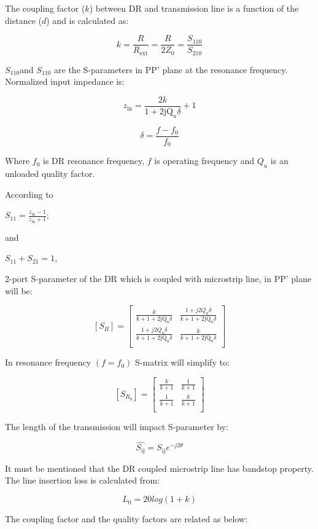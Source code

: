 The coupling factor (\(k\)) between DR and transmission line is a
function of the distance (\(d\)) and is calculated as:

\[k = \frac{R}{R_{\text{ext}}} = \frac{R}{2Z_{0}} = \frac{S_{110}}{S_{210}}\]

\(S_{110}\)and \(S_{110}\) are the S-parameters in PP' plane at the
resonance frequency. Normalized input impedance is:

\[z_{\text{in}} = \frac{2k}{1 + 2\text{jQ}_{u}\delta} + 1\]

\[\delta = \frac{f - f_{0}}{f_{0}}\]

Where \(f_{0}\) is DR resonance frequency, \(f\) is operating frequency
and \(Q_{u}\) is an unloaded quality factor.

According to

\(S_{11} = \frac{z_{\text{in}} - 1}{z_{\text{in}} + 1}\);

and

\(S_{11} + S_{21} = 1\),

2-port S-parameter of the DR which is coupled with microstrip line, in
PP' plane will be:

\[\left\lbrack S_{R} \right\rbrack = \begin{bmatrix}
\frac{k}{k + 1 + 2\text{jQ}_{u}\delta} & \frac{1 + j2Q_{u}\delta}{k + 1 + 2\text{jQ}_{u}\delta} \\
\frac{1 + j2Q_{u}\delta}{k + 1 + 2\text{jQ}_{u}\delta} & \frac{k}{k + 1 + 2\text{jQ}_{u}\delta} \\
\end{bmatrix}\]

In resonance frequency \((f = f_{0})\) S-matrix will simplify to:

\[\left\lbrack S_{R_{0}} \right\rbrack = \begin{bmatrix}
\frac{k}{k + 1} & \frac{1}{k + 1} \\
\frac{1}{k + 1} & \frac{k}{k + 1} \\
\end{bmatrix}\]

The length of the transmission will impact S-parameter by:

\[\widehat{S_{\text{ij}}} = S_{\text{ij}}e^{- j2\theta}\]

It must be mentioned that the DR coupled microstrip line has bandstop
property. The line insertion loss is calculated from:

\[L_{0} = 20log(1 + k)\]

The coupling factor and the quality factors are related as below:

